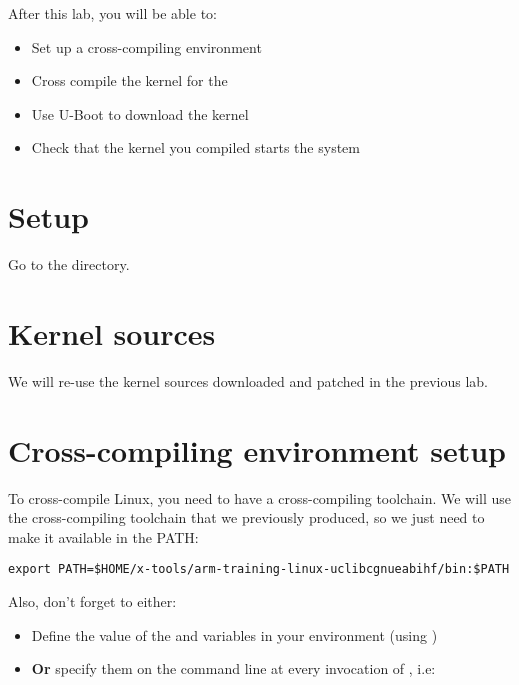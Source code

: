 
After this lab, you will be able to:
\begin{itemize}
\item Set up a cross-compiling environment
\item Cross compile the kernel for the \labboarddescription
\item Use U-Boot to download the kernel
\item Check that the kernel you compiled starts the system
\end{itemize}

\section{Setup}

Go to the  directory.

\section{Kernel sources}

We will re-use the kernel sources downloaded and patched in the
previous lab.

\section{Cross-compiling environment setup}

To cross-compile Linux, you need to have a cross-compiling
toolchain. We will use the cross-compiling toolchain that we
previously produced, so we just need to make it available in the PATH:

\begin{verbatim}
export PATH=$HOME/x-tools/arm-training-linux-uclibcgnueabihf/bin:$PATH
\end{verbatim}

Also, don't forget to either:

\begin{itemize}
\item Define the value of the  and 
  variables in your environment (using )
\item {\bf Or} specify them on the command line at every invocation of
  , i.e: 
\end{itemize}

